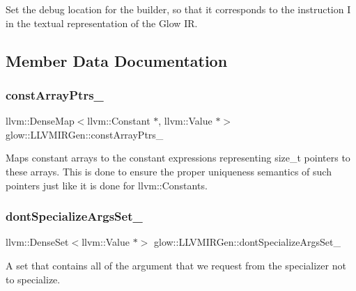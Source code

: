 Set the debug location for the {\ttfamily builder}, so that it corresponds to the instruction {\ttfamily I} in the textual representation of the Glow IR. 

\subsection{Member Data Documentation}
\mbox{\label{classglow_1_1_l_l_v_m_i_r_gen_a19a5a95f9c36d016cd02c6c1e5872117}} 
\subsubsection{\texorpdfstring{const\+Array\+Ptrs\+\_\+}{constArrayPtrs\_}}
{\footnotesize\ttfamily llvm\+::\+Dense\+Map$<$llvm\+::\+Constant $\ast$, llvm\+::\+Value $\ast$$>$ glow\+::\+L\+L\+V\+M\+I\+R\+Gen\+::const\+Array\+Ptrs\+\_\+\hspace{0.3cm}{\ttfamily [protected]}}

Maps constant arrays to the constant expressions representing size\+\_\+t pointers to these arrays. This is done to ensure the proper uniqueness semantics of such pointers just like it is done for llvm\+::\+Constants. \mbox{\label{classglow_1_1_l_l_v_m_i_r_gen_a7de29181c696a6c08cf26614ac84e1ba}} 
\subsubsection{\texorpdfstring{dont\+Specialize\+Args\+Set\+\_\+}{dontSpecializeArgsSet\_}}
{\footnotesize\ttfamily llvm\+::\+Dense\+Set$<$llvm\+::\+Value $\ast$$>$ glow\+::\+L\+L\+V\+M\+I\+R\+Gen\+::dont\+Specialize\+Args\+Set\+\_\+\hspace{0.3cm}{\ttfamily [protected]}}

A set that contains all of the argument that we request from the specializer not to specialize. \mbox{\label{classglow_1_1_l_l_v_m_i_r_gen_a851c519495ca16ec3f09a25e267e624a}} 
